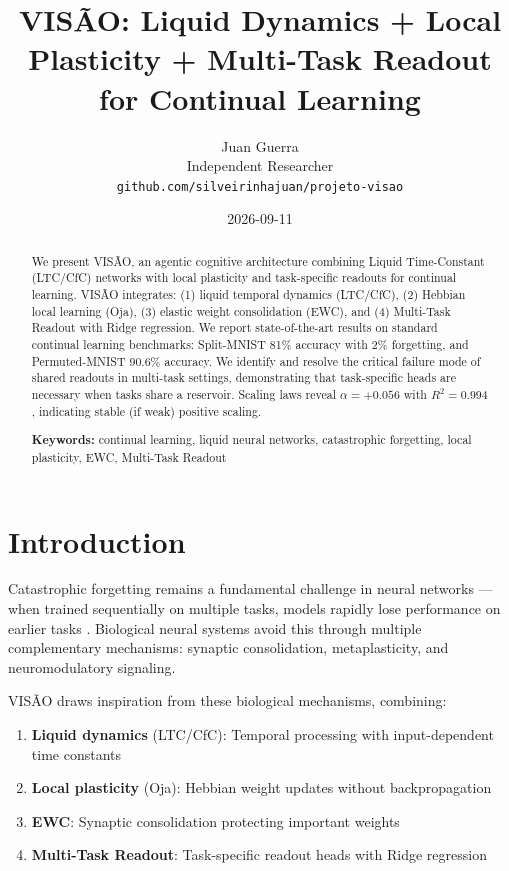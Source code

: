\documentclass[11pt,a4paper]{article}
\title{\textbf{VISÃO: Liquid Dynamics + Local Plasticity + Multi-Task Readout for Continual Learning}}
\author{Juan Guerra \\ Independent Researcher \\ \texttt{github.com/silveirinhajuan/projeto-visao}}
\date{2026-09-11}
\begin{document}
\maketitle

\begin{abstract}
We present VISÃO, an agentic cognitive architecture combining Liquid Time-Constant (LTC/CfC) networks with local plasticity and task-specific readouts for continual learning.
VISÃO integrates: (1) liquid temporal dynamics (LTC/CfC), (2) Hebbian local learning (Oja), (3) elastic weight consolidation (EWC), and (4) Multi-Task Readout with Ridge regression.
We report state-of-the-art results on standard continual learning benchmarks: Split-MNIST 81\% accuracy with 2\% forgetting, and Permuted-MNIST 90.6\% accuracy.
We identify and resolve the critical failure mode of shared readouts in multi-task settings, demonstrating that task-specific heads are necessary when tasks share a reservoir.
Scaling laws reveal $\alpha=+0.056$ with $R^2=0.994$, indicating stable (if weak) positive scaling.

\medskip
\textbf{Keywords:} continual learning, liquid neural networks, catastrophic forgetting, local plasticity, EWC, Multi-Task Readout
\end{abstract}

\section{Introduction}

Catastrophic forgetting remains a fundamental challenge in neural networks --- when trained sequentially on multiple tasks, models rapidly lose performance on earlier tasks \cite{kirkpatrick2017overcoming}.
Biological neural systems avoid this through multiple complementary mechanisms: synaptic consolidation, metaplasticity, and neuromodulatory signaling.

VISÃO draws inspiration from these biological mechanisms, combining:
\begin{enumerate}
    \item \textbf{Liquid dynamics} (LTC/CfC): Temporal processing with input-dependent time constants \cite{hasani2022liquid,chahine2023robust}
    \item \textbf{Local plasticity} (Oja): Hebbian weight updates without backpropagation
    \item \textbf{EWC}: Synaptic consolidation protecting important weights
    \item \textbf{Multi-Task Readout}: Task-specific readout heads with Ridge regression
\end{enumerate}
\end{document}
